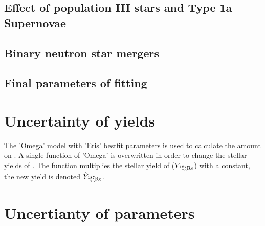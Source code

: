\subsection{Effect of population III stars and Type 1a Supernovae}
\subsection{Binary neutron star mergers}
\subsection{Final parameters of fitting}

\section{Uncertainty of yields}
The 'Omega' model with 'Eris' bestfit parameters is used to calculate the amount on .
A single function of 'Omega' is overwritten in order to change the stellar yields of .
The function multiplies the stellar yield of  ($Y_\re{187}$) with a constant, the new yield is denoted $\hat{Y}_\re{187}$.

\comment{add single uncertainty of %
}

\section{Uncertianty of parameters}
